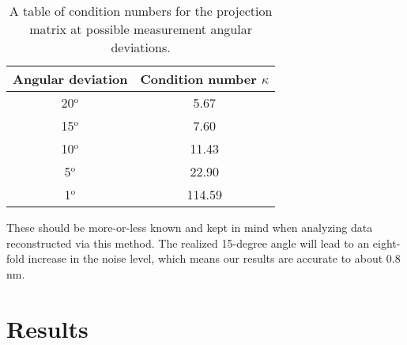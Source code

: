 \documentclass[aip,cp,amsmath,amssymb,reprint]{revtex4-2}
\begin{document}
\begin{table} 
\begin{center}
    \begin{tabular}{|c|c|}
        \hline
        Angular deviation & Condition number $\kappa$ \\
        \hline
        20$^\text{o}$ & 5.67\\
        15$^\text{o}$ & 7.60\\
        10$^\text{o}$ & 11.43\\
        5$^\text{o}$ & 22.90 \\
        1$^\text{o}$ & 114.59\\
        \hline
    \end{tabular}
    \caption{A table of condition numbers for the projection matrix at possible measurement angular deviations.}
\label{kappas}
\end{center}
\end{table}
 
\par{These should be more-or-less known and kept in mind when analyzing data reconstructed via this method. The realized 15-degree angle will lead to an eight-fold increase in the noise level, which means our results are accurate to about 0.8 nm.}


\section{\label{sec:results}Results}
\end{document}
